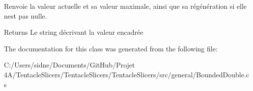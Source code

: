 Renvoie la valeur actuelle et sa valeur maximale, ainsi que sa régénération si elle n\textquotesingle{}est pas nulle. 

\begin{DoxyReturn}{Returns}
Le string décrivant la valeur encadrée 
\end{DoxyReturn}


The documentation for this class was generated from the following file\+:\begin{DoxyCompactItemize}
\item 
C\+:/\+Users/sidne/\+Documents/\+Git\+Hub/\+Projet 4\+A/\+Tentacle\+Slicers/\+Tentacle\+Slicers/\+Tentacle\+Slicers/src/general/Bounded\+Double.\+cs\end{DoxyCompactItemize}
